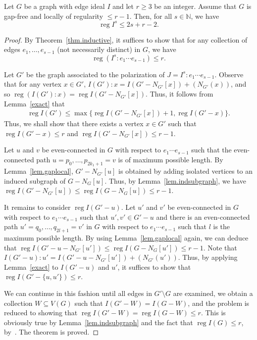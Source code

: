 \documentclass[ALCO,ThmDefs,Unicode,epreuves]{cedram}
\DeclareMathOperator{\reg}{reg}
\newcommand{\NN}{{\mathbb N}}
\newcommand*{\reg}{\mathrm{reg}}
\begin{document}
\begin{theo}\label{thm.gaplocal}
Let $G$ be a graph with edge ideal $I$ and let $r \ge 3$ be an integer. Assume that $G$ is gap-free and locally of regularity $\le r-1$. Then, for all $s \in \NN$, we have
\[
\reg I^s \le 2s + r-2.
\]

\end{theo}

\begin{proof} By Theorem~\ref{thm.inductive}, it suffices to show that for any collection of edges $e_1, \dots, e_{s-1}$ (not necessarily distinct) in $G$, we have
\[
\reg (I^s : e_1 \cdots e_{s-1}) \le r.
\]


Let $G'$ be the graph associated to the polarization of $J = I^s : e_1 \cdots e_{s-1}$. Observe that for any vertex $x \in G'$, $I(G') : x = I(G'-N_{G'}[x]) + (N_{G'}(x))$, and so $\reg (I(G'):x) = \reg I(G'-N_{G'}[x])$. Thus, it follows from Lemma~\ref{exact} that
\begin{align}
\reg I(G') \leq \max \{\reg I(G'-N_{G'}[x])+1, \reg I (G'-x)\}. \label{eq.sesG'}
\end{align}
Thus, we shall show that there exists a vertex $x \in G'$ such that $\reg I(G'-x) \le r$ and $\reg I(G'-N_{G'}[x]) \le r-1$.

Let $u$ and $v$ be even-connected in $G$ with respect to $e_1 \cdots e_{s-1}$ such that the even-connected path $u=p_0,\dots,p_{2k_1+1}=v$ is of maximum possible length. By Lemma~\ref{lem.gaplocal}, $G'-N_{G'}[u]$ is obtained by adding isolated vertices to an induced subgraph of $G - N_G[u]$. Thus, by Lemma~\ref{lem.indsubgraph}, we have $\reg I(G'-N_{G'}[u]) \le \reg I(G - N_G[u]) \le r-1.$

It remains to consider $\reg I(G'-u)$. Let $u'$ and $v'$ be even-connected in $G$ with respect to $e_1 \cdots e_{s-1}$ such that $u',v' \in G'-u$ and there is an even-connected path $u' = q_0, \dots, q_{2l+1}=v'$ in $G$ with respect to $e_1 \cdots e_{s-1}$ such that $l$ is the maximum possible length. By using Lemma~\ref{lem.gaplocal} again, we can deduce that $\reg I(G'-u-N_{G'}[u']) \le \reg I(G-N_G[u']) \le r-1$. Note that $I(G'-u):u' = I(G'-u-N_{G'}[u']) + ( N_{G'}(u'))$. Thus, by applying Lemma~\ref{exact} to $I(G'-u)$ and $u'$, it suffices to show that $\reg I(G' - \{u,u'\}) \le r$.

We can continue in this fashion until all edges in $G' \setminus G$ are examined, \ie we obtain a collection $W \subseteq V(G)$ such that $I(G'-W) = I(G-W)$, and the problem is reduced to showing that $\reg I(G' - W) = \reg I(G - W) \le r$. This is obviously true by Lemma~\ref{lem.indsubgraph} and the fact that $\reg I(G) \le r$, by~\cite[Proposition 4.9]{CHHKTT}. The theorem is proved.
\end{proof}
\end{document}
